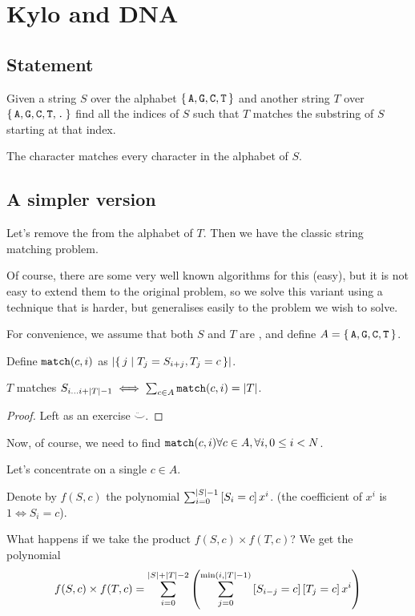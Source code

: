\section{Kylo and DNA}
	\subsection{Statement}
		Given a string $S$ over the alphabet
		$\{\,\texttt{A}, \texttt{G}, \texttt{C}, \texttt{T}\,\}$ and another string
		$T$ over $\{\,\texttt{A}, \texttt{G}, \texttt{C}, \texttt{T}, \texttt{.}\,\}$
		find all the indices of $S$ such that $T$ matches the substring
		of $S$ starting at that index.

		The character  matches every character in the alphabet of $S$.

	\subsection{A simpler version}
		Let's remove the  from the alphabet of $T$.
		Then we have the classic string matching problem.

		Of course, there are some very well known algorithms for this (easy), but it
		is not easy to extend them to the original problem, so we solve this variant
		using a technique that is harder, but generalises easily to the problem we
		wish to solve.

		For convenience, we assume that both $S$ and $T$ are , and define
		$A = \{\,\texttt{A}, \texttt{G}, \texttt{C}, \texttt{T}\,\}$.

		Define $\texttt{match}(c, i)$ as $\card{\{\, j\mid T_j = S_{i + j}, T_j = c\,\}}$.

		\begin{claim}
		$T$ matches $S_{i\dots i + \card{T} - 1} \iff \sum_{c \in A} \ttt{match}(c, i) = \card{T}$.
		\end{claim}

		\begin{proof}
		Left as an exercise $\ddot\smallsmile$.
		\end{proof}

		Now, of course, we need to find $\texttt{match}(c, i) \forall c\in A,
		\forall i, 0 \leq i < N$.

		Let's concentrate on a single $c \in A$.

		Denote by $f(S, c)$ the polynomial
		$\sum_{i = 0}^{\mid S\mid - 1} \left[S_i = c\right] x^i$.
		(the coefficient of $x^i$ is $1 \iff S_i = c$).

		What happens if we take the product $f(S, c) \times f(T, c)$?
		We get the polynomial
		\begin{align*}
			f(S, c) \times f(T, c) &=
			\sum_{i = 0}^{\mid S\mid + \mid T\mid - 2} \left(\sum_{j = 0}^{\min(i, \mid T\mid - 1)}
			\left[S_{i - j} = c\right]\left[T_{j} = c\right] x^i\right)\\
		\end{align*}

